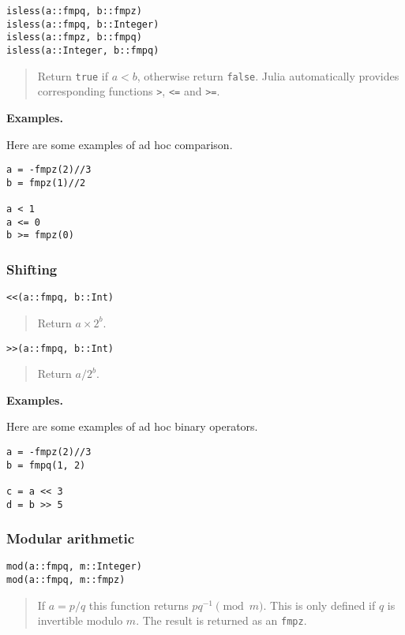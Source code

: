 \documentclass[a4paper,10pt]{article}
\newcommand{\code}{\lstinline}
\newcommand{\desc}[1]{\vspace{-3mm}\begin{quote}#1\end{quote}}
\begin{document}
{{\begin{lstlisting}
isless(a::fmpq, b::fmpz)
isless(a::fmpq, b::Integer)
isless(a::fmpz, b::fmpq)
isless(a::Integer, b::fmpq)
\end{lstlisting}

\desc{Return \code{true} if $a < b$, otherwise return \code{false}. Julia
automatically provides corresponding functions \code{>}, \code{<=} and
\code{>=}.}

\textbf{Examples.}

Here are some examples of ad hoc comparison.

\begin{lstlisting}
a = -fmpz(2)//3
b = fmpz(1)//2

a < 1
a <= 0
b >= fmpz(0)
\end{lstlisting}

\subsubsection{Shifting}

\begin{lstlisting}
<<(a::fmpq, b::Int)
\end{lstlisting}

\desc{Return $a\times 2^b$.}

\begin{lstlisting}
>>(a::fmpq, b::Int)
\end{lstlisting}

\desc{Return $a/2^b$.}

\textbf{Examples.}

Here are some examples of ad hoc binary operators.

\begin{lstlisting}
a = -fmpz(2)//3
b = fmpq(1, 2)

c = a << 3
d = b >> 5
\end{lstlisting}

\subsubsection{Modular arithmetic}

\begin{lstlisting}
mod(a::fmpq, m::Integer)
mod(a::fmpq, m::fmpz)
\end{lstlisting}

\desc{If $a = p/q$ this function returns $pq^{-1} \pmod{m}$. This is only
defined if $q$ is invertible modulo $m$. The result is returned as an \code{fmpz}.}

}}
\end{document}
